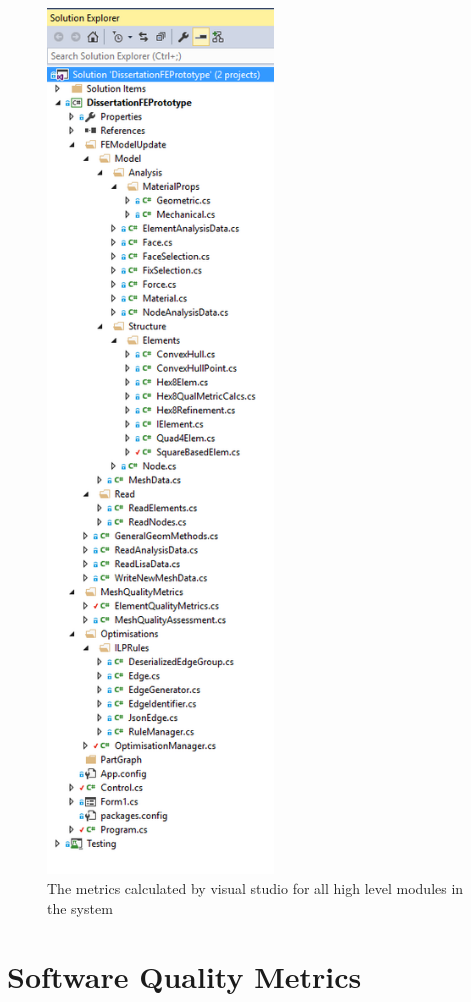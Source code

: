 \begin{figure}[!h]
  \centerline{\includegraphics[width=60mm, scale=0.5]{../Graphics/VSolutionExplorer.png}}
  \caption{The metrics calculated by visual studio for all high level modules in the system}
\end{figure}


\section{Software Quality Metrics}

